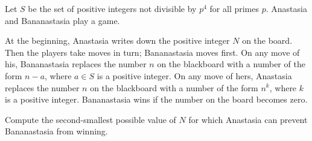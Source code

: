 Let $S$ be the set of positive integers not divisible by $p^4$ for all primes $p$. Anastasia and Bananastasia play a game.

At the beginning, Anastasia writes down the positive integer $N$ on the board. Then the players take moves in turn; Bananastasia moves first. On any move of his, Bananastasia replaces the number $n$ on the blackboard with a number of the form $n-a$, where $a\in S$ is a positive integer. On any move of hers, Anastasia replaces the number $n$ on the blackboard with a number of the form $n^k$, where $k$ is a positive integer. Bananastasia wins if the number on the board becomes zero.

Compute the second-smallest possible value of $N$ for which Anastasia can prevent Bananastasia from winning.
